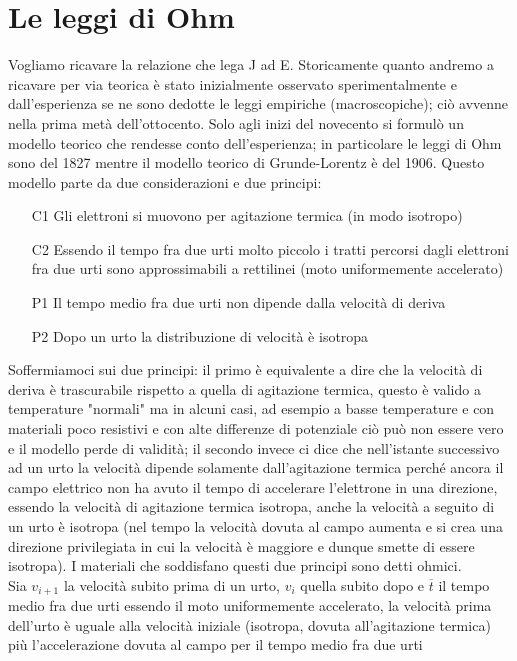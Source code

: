 \documentclass[
10pt, %
a4paper, %
oneside, %
headinclude,footinclude, %
BCOR5mm, %
]{scrartcl}
\begin{document}
\section{Le leggi di Ohm}
Vogliamo ricavare la relazione che lega J ad E. Storicamente quanto andremo a ricavare per via teorica è stato inizialmente osservato sperimentalmente e dall'esperienza se ne sono dedotte le leggi empiriche (macroscopiche); ciò avvenne nella prima metà dell'ottocento. Solo agli inizi del novecento si formulò un modello teorico che rendesse conto dell'esperienza; in particolare le leggi di Ohm sono del 1827 mentre il modello teorico di Grunde-Lorentz è del 1906. Questo modello parte da due considerazioni e due principi:
\begin{itemize}
	\item[C1] Gli elettroni si muovono per agitazione termica (in modo isotropo)
	\item[C2] Essendo il tempo fra due urti molto piccolo i tratti percorsi dagli elettroni fra due urti sono approssimabili a rettilinei (moto uniformemente accelerato)
	\item[P1] Il tempo medio fra due urti non dipende dalla velocità di deriva
	\item[P2] Dopo un urto la distribuzione di velocità è isotropa
\end{itemize}
Soffermiamoci sui due principi: il primo è equivalente a dire che la velocità di deriva è trascurabile rispetto a quella di agitazione termica, questo è valido a temperature "normali" ma in alcuni casi, ad esempio a basse temperature e con materiali poco resistivi e con alte differenze di potenziale ciò può non essere vero e il modello perde di validità; il secondo invece ci dice che nell'istante successivo ad un urto la velocità dipende solamente dall'agitazione termica perché ancora il campo elettrico non ha avuto il tempo di accelerare l'elettrone in una direzione, essendo la velocità di agitazione termica isotropa, anche la velocità a seguito di un urto è isotropa (nel tempo la velocità dovuta al campo aumenta e si crea una direzione privilegiata in cui la velocità è maggiore e dunque smette di essere isotropa). I materiali che soddisfano questi due principi sono detti ohmici.\\
Sia \(v_{i+1}\) la velocità subito prima di un urto, \(v_i\) quella subito dopo e $\overline{t}$ il tempo medio fra due urti essendo il moto uniformemente accelerato, la velocità prima dell'urto è uguale alla velocità iniziale (isotropa, dovuta all'agitazione termica) più l'accelerazione dovuta al campo per il tempo medio fra due urti
\end{document}
